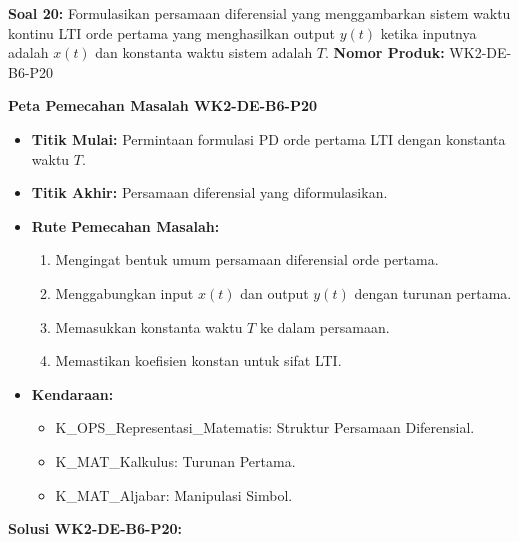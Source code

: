 \documentclass[
  letterpaper,
  DIV=11,
  numbers=noendperiod]{scrreprt}
\providecommand{\tightlist}{%
  \setlength{\itemsep}{0pt}\setlength{\parskip}{0pt}}
\begin{document}
\textbf{Soal 20:} Formulasikan persamaan diferensial yang menggambarkan
sistem waktu kontinu LTI orde pertama yang menghasilkan output \(y(t)\)
ketika inputnya adalah \(x(t)\) dan konstanta waktu sistem adalah \(T\).
\textbf{Nomor Produk:} WK2-DE-B6-P20

\textbf{Peta Pemecahan Masalah WK2-DE-B6-P20}

\begin{itemize}
\tightlist
\item
  \textbf{Titik Mulai:} Permintaan formulasi PD orde pertama LTI dengan
  konstanta waktu \(T\).
\item
  \textbf{Titik Akhir:} Persamaan diferensial yang diformulasikan.
\item
  \textbf{Rute Pemecahan Masalah:}

  \begin{enumerate}
  \def\labelenumi{\arabic{enumi}.}
  \tightlist
  \item
    Mengingat bentuk umum persamaan diferensial orde pertama.
  \item
    Menggabungkan input \(x(t)\) dan output \(y(t)\) dengan turunan
    pertama.
  \item
    Memasukkan konstanta waktu \(T\) ke dalam persamaan.
  \item
    Memastikan koefisien konstan untuk sifat LTI.
  \end{enumerate}
\item
  \textbf{Kendaraan:}

  \begin{itemize}
  \tightlist
  \item
    K\_OPS\_Representasi\_Matematis: Struktur Persamaan Diferensial.
  \item
    K\_MAT\_Kalkulus: Turunan Pertama.
  \item
    K\_MAT\_Aljabar: Manipulasi Simbol.
  \end{itemize}
\end{itemize}

\textbf{Solusi WK2-DE-B6-P20:}
\end{document}
